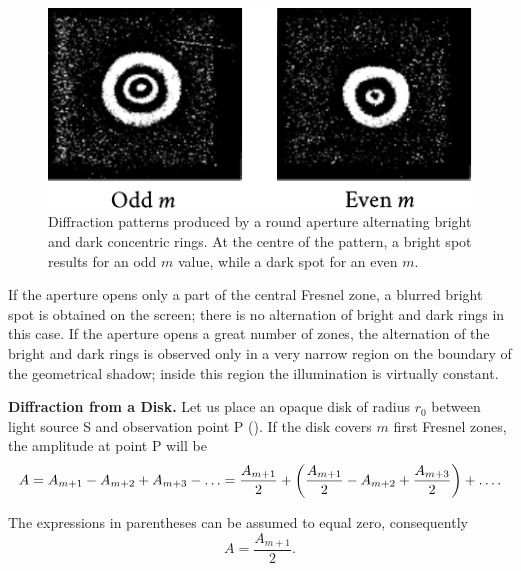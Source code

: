 \begin{figure}[t]
	\begin{center}
		\includegraphics[scale=0.9]{figures/ch_18/fig_18_12.pdf}
        \caption[]{Diffraction patterns produced by a round aperture alternating bright and dark concentric rings. At the centre of the pattern, a bright spot results for an odd $m$ value, while a dark spot for an even $m$.}
		\label{fig:18_12}
	\end{center}
	\vspace{-0.8cm}
\end{figure}

If the aperture opens only a part of the central Fresnel zone, a blurred bright spot is obtained on the screen; there is no alternation of bright and dark rings in this case.
If the aperture opens a great number of zones, the alternation of the bright and dark rings is observed only in a very narrow region on the boundary of the geometrical shadow; inside this region the illumination is virtually constant.

\textbf{Diffraction from a Disk.}
Let us place an opaque disk of radius $r_0$ between light source S and observation point P ().
If the disk covers $m$ first Fresnel zones, the amplitude at point P will be
\begin{equation*}
	A = A_{m+1} - A_{m+2} + A_{m+3} - \ldots = \frac{A_{m+1}}{2} + \left( \frac{A_{m+1}}{2} - A_{m+2} + \frac{A_{m+3}}{2} \right) + \ldots .
\end{equation*}

\noindent
The expressions in parentheses can be assumed to equal zero, consequently
\begin{equation}\label{eq:18_16}
	A = \frac{A_{m+1}}{2}.
\end{equation}

